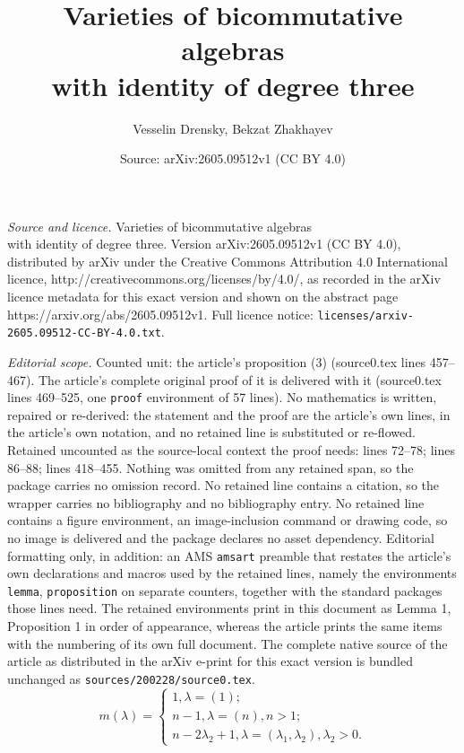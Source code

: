 \documentclass[10pt,a4paper]{amsart}
\title{Varieties of bicommutative algebras\\ with identity of degree three}
\author{Vesselin Drensky, Bekzat Zhakhayev}
\date{Source: arXiv:2605.09512v1 (CC BY 4.0)}
\begin{document}
\maketitle

\noindent\emph{Source and licence.} Varieties of bicommutative algebras\\ with identity of degree three. Version arXiv:2605.09512v1 (CC BY 4.0), distributed by arXiv under the Creative Commons Attribution 4.0 International licence, http://creativecommons.org/licenses/by/4.0/, as recorded in the arXiv licence metadata for this exact version and shown on the abstract page https://arxiv.org/abs/2605.09512v1. Full licence notice: \texttt{licenses/arxiv-2605.09512-CC-BY-4.0.txt}.\par\smallskip

\noindent\textit{Editorial scope.} Counted unit: the article's proposition (3) (source0.tex lines 457--467). The article's complete original proof of it is delivered with it (source0.tex lines 469--525, one \texttt{proof} environment of 57 lines). No mathematics is written, repaired or re-derived: the statement and the proof are the article's own lines, in the article's own notation, and no retained line is substituted or re-flowed.  Retained uncounted as the source-local context the proof needs: lines 72--78; lines 86--88; lines 418--455.  Nothing was omitted from any retained span, so the package carries no omission record.  No retained line contains a citation, so the wrapper carries no bibliography and no bibliography entry.  No retained line contains a figure environment, an image-inclusion command or drawing code, so no image is delivered and the package declares no asset dependency.  Editorial formatting only, in addition: an AMS \texttt{amsart} preamble that restates the article's own declarations and macros used by the retained lines, namely the environments \texttt{lemma}, \texttt{proposition} on separate counters, together with the standard packages those lines need.  The retained environments print in this document as Lemma 1, Proposition 1 in order of appearance, whereas the article prints the same items with the numbering of its own full document.  The complete native source of the article as distributed in the arXiv e-print for this exact version is bundled unchanged as \texttt{sources/200228/source0.tex}.
\begin{equation}\label{multiplicities of cocharacters of B}
m(\lambda)=\begin{cases}
1,\lambda=(1);\\
n-1,\lambda=(n),n>1;\\
n-2\lambda_2+1, \lambda=(\lambda_1,\lambda_2), \lambda_2>0.
\end{cases}
\end{equation}
\end{document}
